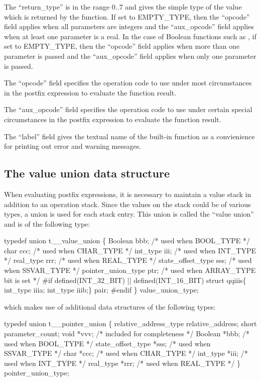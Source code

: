 The ``return\_type'' is in the range 0..7 and gives the simple type of the 
value which is returned by the function.   If set to EMPTY\_TYPE, then
the ``opcode'' field applies when all parameters are integers and the
``aux\_opcode'' field applies when at least one parameter is a real.
In the case of Boolean functions such as , if set to EMPTY\_TYPE,
then the ``opcode'' field applies when more than one parameter is passed
and the ``aux\_opcode'' field applies when only one parameter is passed.

The ``opcode'' field specifies the operation code to use
under most circumstances
in the postfix
expression to evaluate the function result.

The ``aux\_opcode'' field specifies the operation code to use
under certain special circumstances
in the postfix
expression to evaluate the function result.

The ``label'' field gives the textual name of the built-in function as
a convienience for printing out error and warning messages.

\subsection{The value union data structure}
\label{sec:valunion}

When evaluating postfix expressions, it is necessary to maintain a value stack
in addition to an operation stack.   Since the values on the stack could
be of various types, a union is used for each stack entry.    This union
is called the ``value union'' and is of the following type:

\begin{codeexample}
typedef union t__value_union
   \{
     Boolean bbb;            /* used when BOOL_TYPE */
     char ccc;               /* used when CHAR_TYPE */
     int_type iii;           /* used when INT_TYPE */
     real_type rrr;          /* used when REAL_TYPE */
     state_offset_type sss;  /* used when SSVAR_TYPE */
     pointer_union_type ptr; /* used when ARRAY_TYPE bit is set */
#if defined(INT_32_BIT) || defined(INT_16_BIT)
     struct qqiiis\{
        int_type iiia;
        int_type iiib;\} pair;
#endif
   \} value_union_type;
\end{codeexample}

which makes use of additional data structures of the following types:
\begin{codeexample}
typedef union t__pointer_union
   \{
     relative_address_type relative_address;
     short parameter_count;
     void *vvv;               /* included for completeness */
     Boolean *bbb;            /* used when BOOL_TYPE */
     state_offset_type *sss;  /* used when SSVAR_TYPE */
     char *ccc;               /* used when CHAR_TYPE */
     int_type *iii;           /* used when INT_TYPE */
     real_type *rrr;          /* used when REAL_TYPE */
   \} pointer_union_type;
\end{codeexample}

